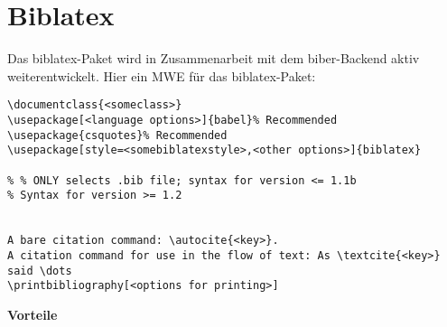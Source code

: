 \section{Biblatex}
Das biblatex-Paket wird in Zusammenarbeit mit dem biber-Backend aktiv weiterentwickelt. Hier ein MWE für das biblatex-Paket:

\begin{lstlisting}[style=LaTeX]
\documentclass{<someclass>}
\usepackage[<language options>]{babel}% Recommended
\usepackage{csquotes}% Recommended
\usepackage[style=<somebiblatexstyle>,<other options>]{biblatex}

% % ONLY selects .bib file; syntax for version <= 1.1b
% Syntax for version >= 1.2


A bare citation command: \autocite{<key>}.
A citation command for use in the flow of text: As \textcite{<key>} said \dots
\printbibliography[<options for printing>]

\end{lstlisting}
\newpage
\textbf{Vorteile}
